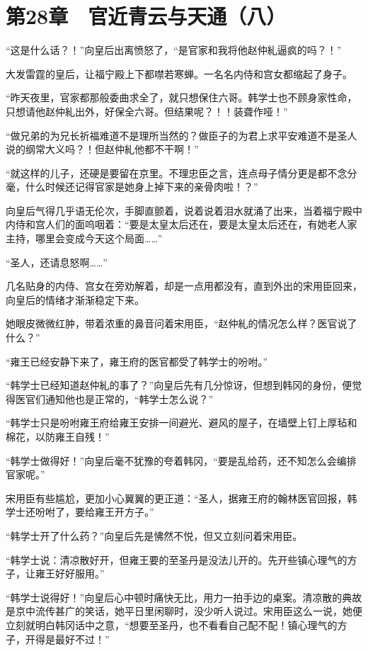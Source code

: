 \section{第28章　官近青云与天通（八）}

“这是什么话？！”向皇后出离愤怒了，“是官家和我将他赵仲糺逼疯的吗？！” 

大发雷霆的皇后，让福宁殿上下都噤若寒蝉。一名名内侍和宫女都缩起了身子。 

“昨天夜里，官家都那般委曲求全了，就只想保住六哥。韩学士也不顾身家性命，只想请他赵仲糺出外，好保全六哥。但结果呢？！！装聋作哑！” 

“做兄弟的为兄长祈福难道不是理所当然的？做臣子的为君上求平安难道不是圣人说的纲常大义吗？！但赵仲糺他都不干啊！” 

“就这样的儿子，还硬是要留在京里。不理忠臣之言，连点母子情分更是都不念分毫，什么时候还记得官家是她身上掉下来的亲骨肉啦！？” 

向皇后气得几乎语无伦次，手脚直颤着，说着说着泪水就涌了出来，当着福宁殿中内侍和宫人们的面呜咽着：“要是太皇太后还在，要是太皇太后还在，有她老人家主持，哪里会变成今天这个局面……” 

“圣人，还请息怒啊……” 

几名贴身的内侍、宫女在旁劝解着，却是一点用都没有，直到外出的宋用臣回来，向皇后的情绪才渐渐稳定下来。 

她眼皮微微红肿，带着浓重的鼻音问着宋用臣，“赵仲糺的情况怎么样？医官说了什么？” 

“雍王已经安静下来了，雍王府的医官都受了韩学士的吩咐。” 

“韩学士已经知道赵仲糺的事了？”向皇后先有几分惊讶，但想到韩冈的身份，便觉得医官们通知他也是正常的，“韩学士怎么说？” 

“韩学士只是吩咐雍王府给雍王安排一间避光、避风的屋子，在墙壁上钉上厚毡和棉花，以防雍王自残！” 

“韩学士做得好！”向皇后毫不犹豫的夸着韩冈，“要是乱给药，还不知怎么会编排官家呢。” 

宋用臣有些尴尬，更加小心翼翼的更正道：“圣人，据雍王府的翰林医官回报，韩学士还吩咐了，要给雍王开方子。” 

“韩学士开了什么药？”向皇后先是怫然不悦，但又立刻问着宋用臣。 

“韩学士说：清凉散好开，但雍王要的至圣丹是没法儿开的。先开些镇心理气的方子，让雍王好好服用。” 

“韩学士说得好！”向皇后心中顿时痛快无比，用力一拍手边的桌案。清凉散的典故是京中流传甚广的笑话，她平日里闲聊时，没少听人说过。宋用臣这么一说，她便立刻就明白韩冈话中之意，“想要至圣丹，也不看看自己配不配！镇心理气的方子，开得是最好不过！” 

